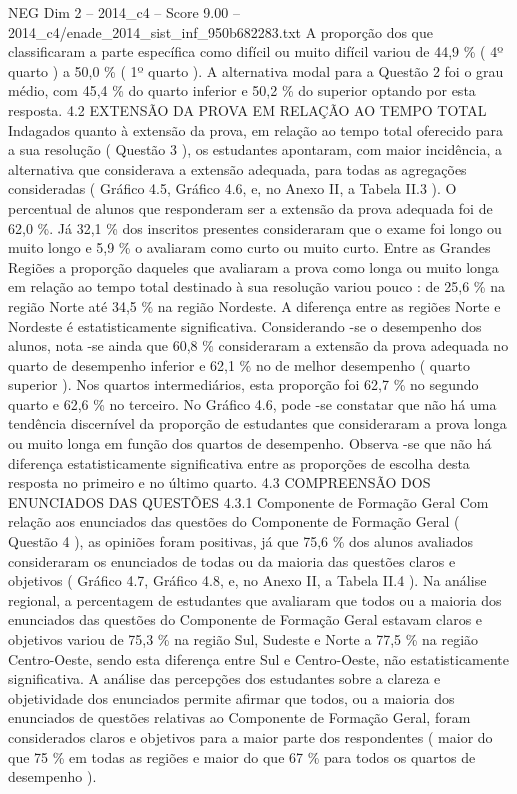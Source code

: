 \begin{textsample}{NEG Dim 2 – 2014\_c4 – Score 9.00 – 2014\_c4/enade\_2014\_sist\_inf\_950b682283.txt}
A proporção dos que classificaram a parte específica como difícil ou muito difícil variou de 44,9 \% ( 4º quarto ) a 50,0 \% ( 1º quarto ).
A alternativa modal para a Questão 2 foi o grau médio, com 45,4 \% do quarto inferior e 50,2 \% do superior optando por esta resposta. 4.2 EXTENSÃO DA PROVA EM RELAÇÃO AO TEMPO TOTAL Indagados quanto à extensão da prova, em relação ao tempo total oferecido para a sua resolução ( Questão 3 ), os estudantes apontaram, com maior incidência, a alternativa que considerava a extensão adequada, para todas as agregações consideradas ( Gráfico 4.5, Gráfico 4.6, e, no Anexo II, a Tabela II.3 ).
O percentual de alunos que responderam ser a extensão da prova adequada foi de 62,0 \%.
Já 32,1 \% dos inscritos presentes consideraram que o exame foi longo ou muito longo e 5,9 \% o avaliaram como curto ou muito curto.
Entre as Grandes Regiões a proporção daqueles que avaliaram a prova como longa ou muito longa em relação ao tempo total destinado à sua resolução variou pouco : de 25,6 \% na região Norte até 34,5 \% na região Nordeste.
A diferença entre as regiões Norte e Nordeste é estatisticamente significativa.
Considerando -se o desempenho dos alunos, nota -se ainda que 60,8 \% consideraram a extensão da prova adequada no quarto de desempenho inferior e 62,1 \% no de melhor desempenho ( quarto superior ).
Nos quartos intermediários, esta proporção foi 62,7 \% no segundo quarto e 62,6 \% no terceiro.
No Gráfico 4.6, pode -se constatar que não há uma tendência discernível da proporção de estudantes que consideraram a prova longa ou muito longa em função dos quartos de desempenho.
Observa -se que não há diferença estatisticamente significativa entre as proporções de escolha desta resposta no primeiro e no último quarto. 4.3 COMPREENSÃO DOS ENUNCIADOS DAS QUESTÕES 4.3.1 Componente de Formação Geral Com relação aos enunciados das questões do Componente de Formação Geral ( Questão 4 ), as opiniões foram positivas, já que 75,6 \% dos alunos avaliados consideraram os enunciados de todas ou da maioria das questões claros e objetivos ( Gráfico 4.7, Gráfico 4.8, e, no Anexo II, a Tabela II.4 ).
Na análise regional, a percentagem de estudantes que avaliaram que todos ou a maioria dos enunciados das questões do Componente de Formação Geral estavam claros e objetivos variou de 75,3 \% na região Sul, Sudeste e Norte a 77,5 \% na região Centro-Oeste, sendo esta diferença entre Sul e Centro-Oeste, não estatisticamente significativa.
A análise das percepções dos estudantes sobre a clareza e objetividade dos enunciados permite afirmar que todos, ou a maioria dos enunciados de questões relativas ao Componente de Formação Geral, foram considerados claros e objetivos para a maior parte dos respondentes ( maior do que 75 \% em todas as regiões e maior do que 67 \% para todos os quartos de desempenho ).

\end{textsample}
